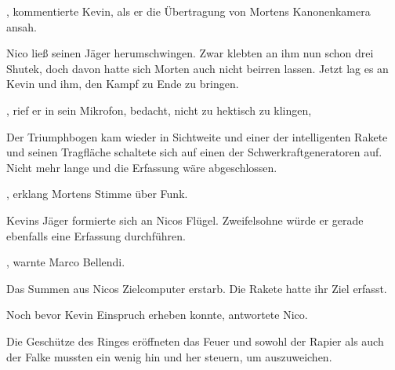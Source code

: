 , kommentierte Kevin, als er die Übertragung von Mortens Kanonenkamera ansah. 

\par

Nico ließ seinen Jäger herumschwingen. Zwar klebten an ihm nun schon drei Shutek, doch davon hatte sich Morten auch nicht beirren lassen. Jetzt lag es an Kevin und ihm, den Kampf zu Ende zu bringen.

\par

, rief er in sein Mikrofon, bedacht, nicht zu hektisch zu klingen, 

\par

Der Triumphbogen kam wieder in Sichtweite und einer der intelligenten Rakete und seinen Tragfläche schaltete sich auf einen der Schwerkraftgeneratoren auf. Nicht mehr lange und die Erfassung wäre abgeschlossen.

\par

, erklang Mortens Stimme über Funk. 

\par

Kevins Jäger formierte sich an Nicos Flügel. Zweifelsohne würde er gerade ebenfalls eine Erfassung durchführen.

\par

, warnte Marco Bellendi. 

\par

Das Summen aus Nicos Zielcomputer erstarb. Die Rakete hatte ihr Ziel erfasst.

\par


\par

Noch bevor Kevin Einspruch erheben konnte, antwortete Nico. 

\par

Die Geschütze des Ringes eröffneten das Feuer und sowohl der Rapier als auch der Falke mussten ein wenig hin und her steuern, um auszuweichen.

